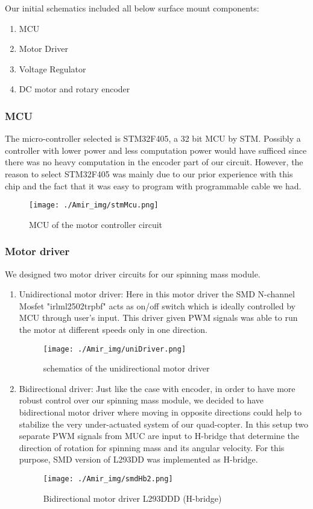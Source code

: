  Our initial schematics included all below surface mount components:
 
\begin{enumerate}
\item MCU
\item  Motor Driver
\item Voltage Regulator
\item DC motor and rotary encoder
\end{enumerate}
 
\subsubsection{MCU}
The micro-controller selected is STM32F405, a 32 bit MCU by STM. Possibly a controller with lower power and less computation power would have sufficed since there was no heavy computation in the encoder part of our circuit. However, the reason to select STM32F405 was mainly due to our prior experience with this chip and the fact that it was easy to program with programmable cable we had. 

\begin{figure}[H]
\centering
\texttt{[image: ./Amir\_img/stmMcu.png]}
\caption{MCU of the motor controller circuit}
\end{figure}

\subsubsection{Motor driver}
We designed two motor driver circuits for our spinning mass module. 
\begin{enumerate}
 \item Unidirectional motor driver: 
 Here in this motor driver the SMD N-channel Mosfet "irlml2502trpbf" acts as on/off switch which is ideally controlled by MCU through user's input. This driver given PWM signals was able to run the motor at different speeds only in one direction. 
\begin{figure}[H]
\centering
\texttt{[image: ./Amir\_img/uniDriver.png]}
\caption{schematics of the unidirectional motor driver}
\end{figure} 
 \item Bidirectional driver:
 Just like the case with encoder, in order to have more robust control over our spinning mass module, we decided to have bidirectional motor driver where moving in opposite directions could help to stabilize the very under-actuated system of our quad-copter. In this setup two separate PWM signals from MUC are input to H-bridge that determine the direction of rotation for spinning mass and its angular velocity. For this purpose, SMD version of L293DD was implemented as H-bridge. 
 \begin{figure}[H]
\centering
\texttt{[image: ./Amir\_img/smdHb2.png]}
\caption{Bidirectional motor driver L293DDD (H-bridge)}
\end{figure} 
\end{enumerate}

